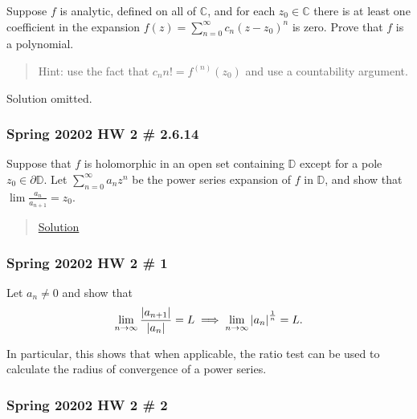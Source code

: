 Suppose \(f\) is analytic, defined on all of \({\mathbb{C}}\), and for
each \(z_0 \in {\mathbb{C}}\) there is at least one coefficient in the
expansion \(f(z) = \sum_{n=0}^\infty c_n(z-z_0)^n\) is zero. Prove that
\(f\) is a polynomial.

\begin{quote}
Hint: use the fact that \(c_n n! = f^{(n)}(z_0)\) and use a countability
argument.
\end{quote}

Solution omitted.

\hypertarget{spring-20202-hw-2-2.6.14}{%
\subsubsection{Spring 20202 HW 2 \#
2.6.14}\label{spring-20202-hw-2-2.6.14}}

Suppose that \(f\) is holomorphic in an open set containing
\({\mathbb{D}}\) except for a pole \(z_0 \in {{\partial}}{\mathbb{D}}\).
Let \(\sum_{n=0}^\infty a_n z^n\) be the power series expansion of \(f\)
in \({\mathbb{D}}\), and show that \(\lim \frac{a_n}{a_{n+1}} = z_0\).

\begin{quote}
\href{https://math.stackexchange.com/questions/1358964/show-that-lim-limits-n-fraca-na-n1-z-0?rq=1}{Solution}
\end{quote}

\hypertarget{spring-20202-hw-2-1}{%
\subsubsection{Spring 20202 HW 2 \# 1}\label{spring-20202-hw-2-1}}

Let \(a_n\neq 0\) and show that
\begin{align*}
\lim_{n\to \infty} {{\left\lvert {a_{n+1}} \right\rvert} \over {\left\lvert {a_n} \right\rvert}} = L \implies \lim_{n\to\infty} {\left\lvert {a_n} \right\rvert}^{1\over n} = L
.\end{align*}

In particular, this shows that when applicable, the ratio test can be
used to calculate the radius of convergence of a power series.

\hypertarget{spring-20202-hw-2-2}{%
\subsubsection{Spring 20202 HW 2 \# 2}\label{spring-20202-hw-2-2}}

